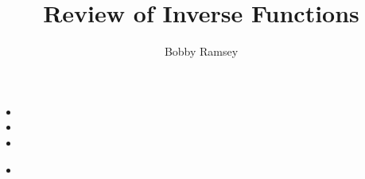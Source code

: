 \documentclass{ximera}
\author{Bobby Ramsey}
\title{Review of Inverse Functions}
\begin{document}
\begin{abstract}
\end{abstract}
\maketitle


\begin{objectives}
	\item 
		\begin{itemize}
			\item 
			\item 
			\item 
		\end{itemize}
	
	\item
		\begin{itemize}
			\item 
		\end{itemize}
\end{objectives}
\end{document}
